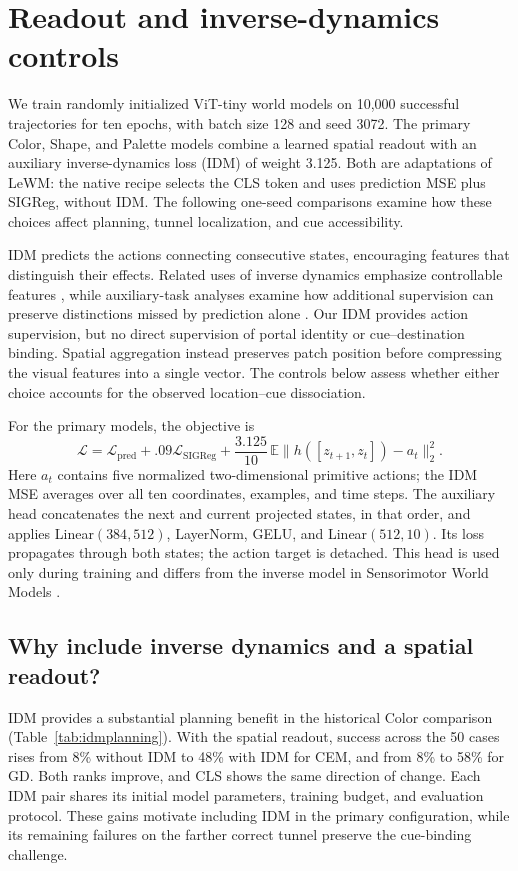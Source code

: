 \section{Readout and inverse-dynamics controls}
\label{app:ablations}

We train randomly initialized ViT-tiny world models on 10,000 successful
trajectories for ten epochs, with batch size 128 and seed 3072. The primary
Color, Shape, and Palette models combine a learned spatial readout with an auxiliary
inverse-dynamics loss (IDM) of weight 3.125. Both are adaptations of LeWM:
the native recipe selects the CLS token and uses prediction MSE plus SIGReg,
without IDM. The following one-seed comparisons examine how these choices
affect planning, tunnel localization, and cue accessibility.

IDM predicts the actions connecting consecutive states, encouraging features
that distinguish their effects. Related uses of inverse dynamics emphasize
controllable features \citep{ivashkov2026sensorimotor}, while auxiliary-task
analyses examine how additional supervision can preserve distinctions missed
by prediction alone \citep{yu2025auxjepa}. Our IDM provides action supervision,
but no direct supervision of portal identity or cue--destination binding.
Spatial aggregation instead preserves patch position before compressing the
visual features into a single vector. The controls below assess whether
either choice accounts for the observed location--cue dissociation.

For the primary models, the objective is
\[
 \mathcal L=\mathcal L_{\mathrm{pred}}+.09\mathcal L_{\mathrm{SIGReg}}
 +\frac{3.125}{10}\,\mathbb E\|h([z_{t+1},z_t])-a_t\|_2^2.
\]
Here $a_t$ contains five normalized two-dimensional primitive actions;
the IDM MSE averages over all ten coordinates, examples, and time steps.
The auxiliary head concatenates the next and current projected states, in
that order, and applies
Linear$(384,512)$, LayerNorm, GELU, and Linear$(512,10)$. Its loss propagates
through both states; the action target is detached. This head is used only
during training and differs from the inverse model in Sensorimotor World
Models \citep{ivashkov2026sensorimotor}.

\subsection{Why include inverse dynamics and a spatial readout?}

IDM provides a substantial planning benefit in the historical Color
comparison (Table~\ref{tab:idmplanning}). With the spatial readout, success
across the 50 cases rises from 8\% without IDM to 48\% with IDM for CEM,
and from 8\% to 58\% for GD. Both ranks improve, and CLS shows the same
direction of change. Each IDM pair shares its initial model parameters,
training budget, and evaluation protocol. These gains motivate including
IDM in the primary configuration, while its remaining failures on the
farther correct tunnel preserve the cue-binding challenge.

